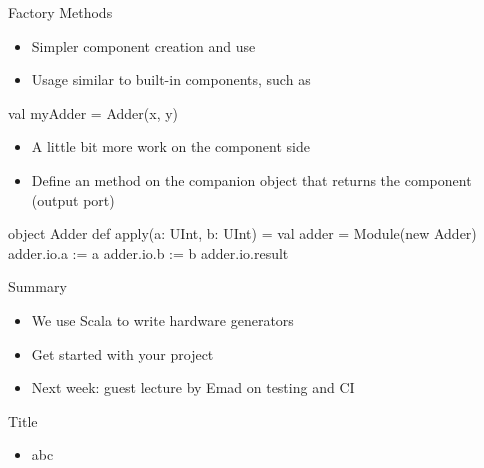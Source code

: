 \begin{frame}[fragile]{Factory Methods}
\begin{itemize}
\item Simpler component creation and use
\item Usage similar to built-in components, such as 
\end{itemize}
\begin{chisel}
val myAdder = Adder(x, y)
\end{chisel}
\begin{itemize}
\item A little bit more work on the component side
\item Define an  method on the companion object that returns the component (output port)
\end{itemize}
\begin{chisel}
object Adder {
  def apply(a: UInt, b: UInt) = {
    val adder = Module(new Adder)
    adder.io.a := a
    adder.io.b := b
    adder.io.result
  }
}
\end{chisel}
\end{frame}



\begin{frame}[fragile]{Summary}
\begin{itemize}
\item We use Scala to write hardware generators
\item Get started with your project
\item Next week: guest lecture by Emad on testing and CI
\end{itemize}
\end{frame}




\begin{frame}[fragile]{Title}
\begin{itemize}
\item abc
\end{itemize}
\end{frame}
